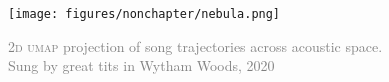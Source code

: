 
\thispagestyle{empty}
\pagecolor{chapterback}
\onecolumn 
\normalsize
\begin{center}
    \color{white}
    \vspace*{.2cm} %
  
    \thispagestyle{empty}
    \texttt{[image: figures/nonchapter/nebula.png]}
    \vspace*{\fill}
    \begin{center}
        \textcolor{gray}{\textsc{2d umap} projection of song trajectories across acoustic space.\\Sung by great tits in Wytham Woods, 2020}
    \end{center}
    
\end{center}
